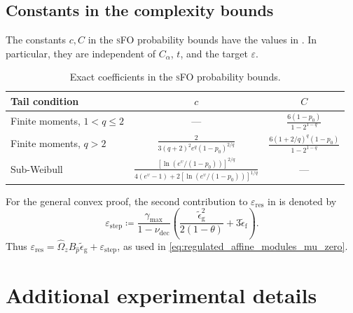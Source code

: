\documentclass{article}
\begin{document}
\subsection{Constants in the complexity bounds}
\label{app:complexity_constants}
The constants \(c,C\) in the \textsc{sFO} probability bounds have the
values in . In particular, they are independent
of \(C_\alpha\), \(t\), and the target \(\varepsilon\).
\begin{table}[!htbp]
\centering
\caption{Exact coefficients in the \textsc{sFO} probability bounds.}
\label{tab:sfo_tail_constants}
\renewcommand{\arraystretch}{1.7}
\begin{tabular}{@{}lcc@{}}
\toprule
Tail condition & \(c\) & \(C\)\\
\midrule
Finite moments, \(1<q\le2\)
& --- & \(\displaystyle\frac{6(1-p_0)}{1-2^{1-q}}\)\\
\addlinespace[5pt]
Finite moments, \(q>2\)
& \(\displaystyle\frac{2}{3(q+2)^2e^q(1-p_0)^{2/q}}\)
& \(\displaystyle\frac{6(1+2/q)^q(1-p_0)}{1-2^{1-q}}\)\\
\addlinespace[5pt]
Sub-Weibull
& \(\displaystyle\frac{[\ln(e^\upsilon/(1-p_0))]^{2/q}}
{4(e^\upsilon-1)+2[\ln(e^\upsilon/(1-p_0))]^{1/q}}\)
& ---\\
\bottomrule
\end{tabular}
\end{table}
\FloatBarrier

For the general convex proof, the second contribution to
\(\varepsilon_{\mathrm{res}}\) in 
is denoted by
\begin{equation}\label{eq:regulated_step_residual_mu_zero}
\varepsilon_{\mathrm{step}}\coloneqq 
\frac{\gamma_{\max}}{1-\nu_{\mathrm{dec}}}
\left(\frac{\widetilde\epsilon_{\mathrm{g}}^2}{2(1-\theta)}
+3\widetilde\epsilon_{\mathrm{f}}\right).
\end{equation}
Thus \(\varepsilon_{\mathrm{res}}=
\widehat\Omega_zB_{\hat p}\widetilde\epsilon_{\mathrm{g}}+
\varepsilon_{\mathrm{step}}\), as used in
\eqref{eq:regulated_affine_modules_mu_zero}.

\clearpage
\begingroup

\captionsetup{font=small,labelfont=bf,skip=6pt,
  justification=raggedright,singlelinecheck=false}
\renewcommand{\arraystretch}{1.12}
\setlength{\textfloatsep}{14pt plus 2pt minus 2pt}
\setlength{\intextsep}{14pt plus 2pt minus 2pt}
\setlength{\floatsep}{12pt plus 2pt minus 2pt}

\section{Additional experimental details}
\label{app:exp_selected_details}
\end{document}
